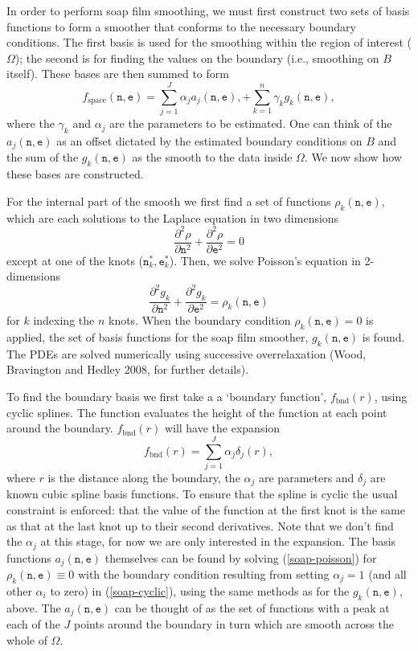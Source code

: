 \documentclass[10pt] {article}
\newcommand{\beq}{\begin{equation}}
\newcommand{\eeq}{\end{equation}}
\theoremstyle{definition}
\theoremstyle{plain}
\begin{document}
In order to perform soap film smoothing, we must first construct two sets of basis functions to form a smoother that conforms to the necessary boundary conditions. The first basis is used for the smoothing within the region of interest ($\Omega$); the second is for finding the values on the boundary (i.e., smoothing on $B$ itself). These bases are then summed to form
\beq
f_\text{space}(\texttt{n},\texttt{e})=\sum_{j=1}^J \alpha_j a_j(\texttt{n},\texttt{e}),+\sum_{k=1}^n \gamma_k g_k(\texttt{n},\texttt{e}),
\eeq
where the $\gamma_k$ and $\alpha_j$ are the parameters to be estimated. One can think of the $a_j(\texttt{n},\texttt{e})$ as an offset dictated by the estimated boundary conditions on $B$ and the sum of the $g_k(\texttt{n},\texttt{e})$ as the smooth to the data inside $\Omega$. We now show how these bases are constructed.

For the internal part of the smooth we first find a set of functions $\rho_k(\texttt{n},\texttt{e})$, which are each solutions to the Laplace equation in two dimensions
\beq
\frac{\partial^2\rho}{\partial \texttt{n}^2} + \frac{\partial^2\rho}{\partial \texttt{e}^2} = 0
\eeq
except at one of the knots ($\texttt{n}^*_k,\texttt{e}^*_k$). Then, we solve Poisson's equation in 2-dimensions
\beq
\frac{\partial^2 g_k}{\partial \texttt{n}^2} + \frac{\partial^2 g_k}{\partial \texttt{e}^2} = \rho_k(\texttt{n},\texttt{e})
\label{soap-poisson}
\eeq
for $k$ indexing the $n$ knots. When the boundary condition $\rho_k(\texttt{n},\texttt{e})=0$ is applied, the set of basis functions for the soap film smoother, $g_k(\texttt{n},\texttt{e})$ is found.  The PDEs are solved numerically using successive overrelaxation (Wood, Bravington and Hedley 2008, for further details).

To find the boundary basis we first take a a `boundary function', $f_\text{bnd}(r)$, using cyclic splines. The function evaluates the height of the function at each point around the boundary. $f_\text{bnd}(r)$ will have the expansion
\beq
f_\text{bnd}(r)=\sum_{j=1}^J \alpha_j \delta_j(r),
\label{soap-cyclic}
\eeq
where $r$ is the distance along the boundary, the $\alpha_j$ are parameters and $\delta_j$ are known cubic spline basis functions. To ensure that the spline is cyclic the usual constraint is enforced: that the value of the function at the first knot is the same as that at the last knot up to their second derivatives. Note that we don't find the $\alpha_j$ at this stage, for now we are only interested in the expansion. The basis functions $a_j(\texttt{n},\texttt{e})$ themselves can be found by solving (\ref{soap-poisson}) for $\rho_k(\texttt{n},\texttt{e})\equiv 0$ with the boundary condition resulting from setting $\alpha_j=1$ (and all other $\alpha_i$ to zero) in (\ref{soap-cyclic}), using the same methods as for the $g_k(\texttt{n},\texttt{e})$, above. The $a_j(\texttt{n},\texttt{e})$ can be thought of as the set of functions with a peak at each of the $J$ points around the boundary in turn which are smooth across the whole of $\Omega$.
\end{document}

